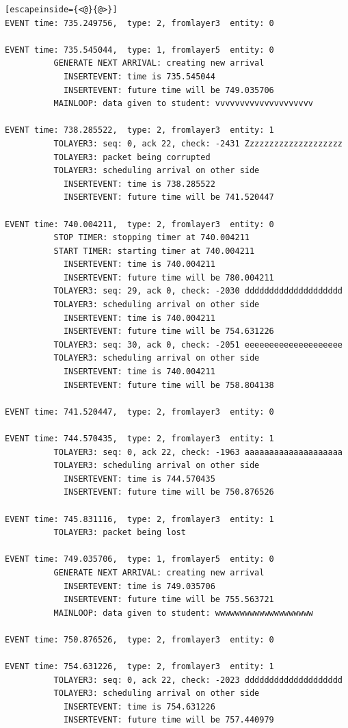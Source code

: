 \documentclass[paper=a4, fontsize=11pt]{scrartcl}
\numberwithin{equation}{section}		%
\numberwithin{figure}{section}			%
\numberwithin{table}{section}				%
\begin{document}
\begin{lstlisting}[escapeinside={<@}{@>}]
EVENT time: 735.249756,  type: 2, fromlayer3  entity: 0

EVENT time: 735.545044,  type: 1, fromlayer5  entity: 0
          GENERATE NEXT ARRIVAL: creating new arrival
            INSERTEVENT: time is 735.545044
            INSERTEVENT: future time will be 749.035706
          MAINLOOP: data given to student: vvvvvvvvvvvvvvvvvvvv

EVENT time: 738.285522,  type: 2, fromlayer3  entity: 1
          TOLAYER3: seq: 0, ack 22, check: -2431 Zzzzzzzzzzzzzzzzzzzz
          TOLAYER3: packet being corrupted
          TOLAYER3: scheduling arrival on other side
            INSERTEVENT: time is 738.285522
            INSERTEVENT: future time will be 741.520447

EVENT time: 740.004211,  type: 2, fromlayer3  entity: 0
          STOP TIMER: stopping timer at 740.004211
          START TIMER: starting timer at 740.004211
            INSERTEVENT: time is 740.004211
            INSERTEVENT: future time will be 780.004211
          TOLAYER3: seq: 29, ack 0, check: -2030 dddddddddddddddddddd
          TOLAYER3: scheduling arrival on other side
            INSERTEVENT: time is 740.004211
            INSERTEVENT: future time will be 754.631226
          TOLAYER3: seq: 30, ack 0, check: -2051 eeeeeeeeeeeeeeeeeeee
          TOLAYER3: scheduling arrival on other side
            INSERTEVENT: time is 740.004211
            INSERTEVENT: future time will be 758.804138

EVENT time: 741.520447,  type: 2, fromlayer3  entity: 0

EVENT time: 744.570435,  type: 2, fromlayer3  entity: 1
          TOLAYER3: seq: 0, ack 22, check: -1963 aaaaaaaaaaaaaaaaaaaa
          TOLAYER3: scheduling arrival on other side
            INSERTEVENT: time is 744.570435
            INSERTEVENT: future time will be 750.876526

EVENT time: 745.831116,  type: 2, fromlayer3  entity: 1
          TOLAYER3: packet being lost

EVENT time: 749.035706,  type: 1, fromlayer5  entity: 0
          GENERATE NEXT ARRIVAL: creating new arrival
            INSERTEVENT: time is 749.035706
            INSERTEVENT: future time will be 755.563721
          MAINLOOP: data given to student: wwwwwwwwwwwwwwwwwwww

EVENT time: 750.876526,  type: 2, fromlayer3  entity: 0

EVENT time: 754.631226,  type: 2, fromlayer3  entity: 1
          TOLAYER3: seq: 0, ack 22, check: -2023 dddddddddddddddddddd
          TOLAYER3: scheduling arrival on other side
            INSERTEVENT: time is 754.631226
            INSERTEVENT: future time will be 757.440979


\end{lstlisting}
\end{document}
